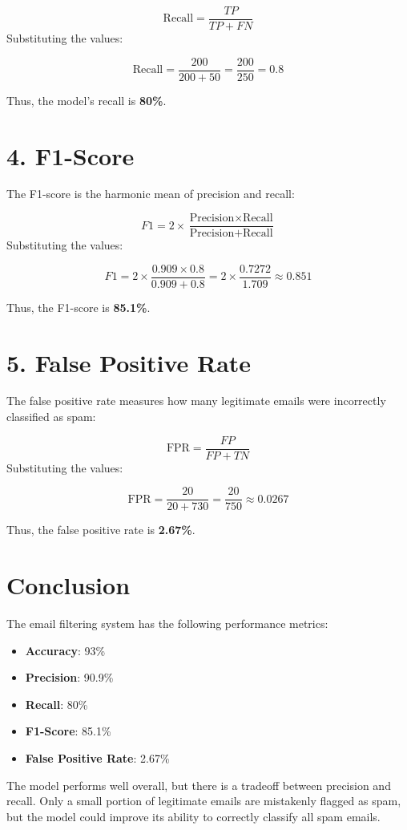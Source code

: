 \documentclass{article}
\begin{document}
\[
\text{Recall} = \frac{TP}{TP + FN}
\]
Substituting the values:

\[
\text{Recall} = \frac{200}{200 + 50} = \frac{200}{250} = 0.8
\]

Thus, the model's recall is \textbf{80\%}.

\section*{4. F1-Score}
The F1-score is the harmonic mean of precision and recall:

\[
F1 = 2 \times \frac{\text{Precision} \times \text{Recall}}{\text{Precision} + \text{Recall}}
\]
Substituting the values:

\[
F1 = 2 \times \frac{0.909 \times 0.8}{0.909 + 0.8} = 2 \times \frac{0.7272}{1.709} \approx 0.851
\]

Thus, the F1-score is \textbf{85.1\%}.

\section*{5. False Positive Rate}
The false positive rate measures how many legitimate emails were incorrectly classified as spam:

\[
\text{FPR} = \frac{FP}{FP + TN}
\]
Substituting the values:

\[
\text{FPR} = \frac{20}{20 + 730} = \frac{20}{750} \approx 0.0267
\]

Thus, the false positive rate is \textbf{2.67\%}.

\section*{Conclusion}
The email filtering system has the following performance metrics:
\begin{itemize}
    \item \textbf{Accuracy}: 93\%
    \item \textbf{Precision}: 90.9\%
    \item \textbf{Recall}: 80\%
    \item \textbf{F1-Score}: 85.1\%
    \item \textbf{False Positive Rate}: 2.67\%
\end{itemize}

The model performs well overall, but there is a tradeoff between precision and recall. Only a small portion of legitimate emails are mistakenly flagged as spam, but the model could improve its ability to correctly classify all spam emails.
\end{document}
